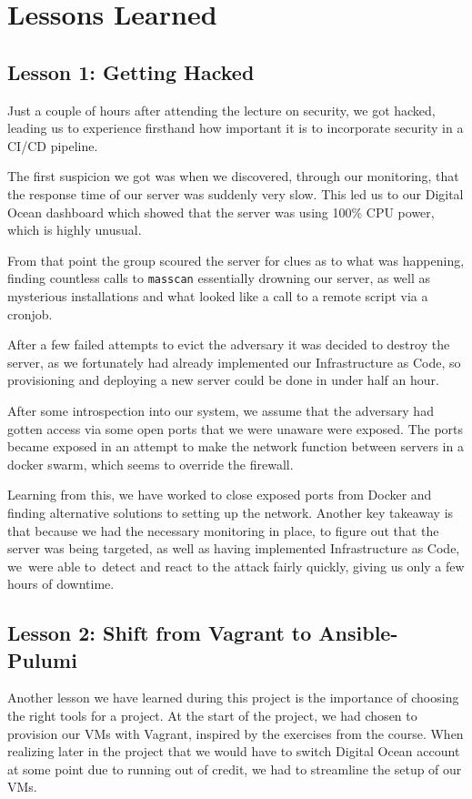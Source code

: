 \section{Lessons Learned}

\subsection{Lesson 1: Getting Hacked}
\label{section_hacked}
Just a couple of hours after attending the lecture on security, we got hacked, leading us to experience firsthand how important it is to incorporate security in a CI/CD pipeline.

The first suspicion we got was when we discovered, through our monitoring, that the response time of our server was suddenly very slow. This led us to our Digital Ocean dashboard which showed that the server was using 100\% CPU power, which is highly unusual.

From that point the group scoured the server for clues as to what was happening, finding countless calls to \texttt{masscan} essentially drowning our server, as well as mysterious installations and what looked like a call to a remote script via a cronjob.

After a few failed attempts to evict the adversary it was decided to destroy the server, as we fortunately had already implemented our Infrastructure as Code, so provisioning and deploying a new server could be done in under half an hour.

After some introspection into our system, we assume that the adversary had gotten access via some open ports that we were unaware were exposed. The ports became exposed in an attempt to make the network function between servers in a docker swarm, which seems to override the firewall.

Learning from this, we have worked to close exposed ports from Docker and finding alternative solutions to setting up the network. Another key takeaway is that because we had the necessary monitoring in place, to figure out that the server was being targeted, as well as having implemented Infrastructure as Code, we were able to detect and react to the attack fairly quickly, giving us only a few hours of downtime.

\subsection{Lesson 2: Shift from Vagrant to Ansible-Pulumi}
Another lesson we have learned during this project is the importance of choosing the right tools for a project.
At the start of the project, we had chosen to provision our VMs with Vagrant, inspired by the exercises from the course.
When realizing later in the project that we would have to switch Digital Ocean account at some point due to running out of credit, we had to streamline the setup of our VMs.

